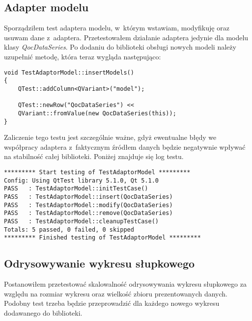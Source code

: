 \subsection{Adapter modelu}
Sporządziłem test adaptera modelu, w~którym wstawiam, modyfikuję oraz usuwam dane z~adaptera. Przetestowałem działanie adaptera jedynie dla modelu klasy \textit{QocDataSeries}. Po dodaniu do biblioteki obsługi nowych modeli należy uzupełnić metodę, która teraz wygląda następująco:

\begin{lstlisting}
void TestAdaptorModel::insertModels()
{
	QTest::addColumn<QVariant>("model");

	QTest::newRow("QocDataSeries") << 
	QVariant::fromValue(new QocDataSeries(this));
}
\end{lstlisting}

Zaliczenie tego testu jest szczególnie ważne, gdyż ewentualne błędy we współpracy adaptera z~faktycznym źródłem danych będzie negatywnie wpływać na stabilność całej biblioteki. Poniżej znajduje się log testu.

\begin{lstlisting}
********* Start testing of TestAdaptorModel *********
Config: Using QtTest library 5.1.0, Qt 5.1.0
PASS   : TestAdaptorModel::initTestCase()
PASS   : TestAdaptorModel::insert(QocDataSeries)
PASS   : TestAdaptorModel::modify(QocDataSeries)
PASS   : TestAdaptorModel::remove(QocDataSeries)
PASS   : TestAdaptorModel::cleanupTestCase()
Totals: 5 passed, 0 failed, 0 skipped
********* Finished testing of TestAdaptorModel *********
\end{lstlisting}

\subsection{Odrysowywanie wykresu słupkowego}
Postanowiłem przetestować skalowalność odrysowywania wykresu słupkowego za względu na rozmiar wykresu oraz wielkość zbioru prezentowanych danych. Podobny test trzeba będzie przeprowadzić dla każdego nowego wykresu dodawanego do biblioteki.


